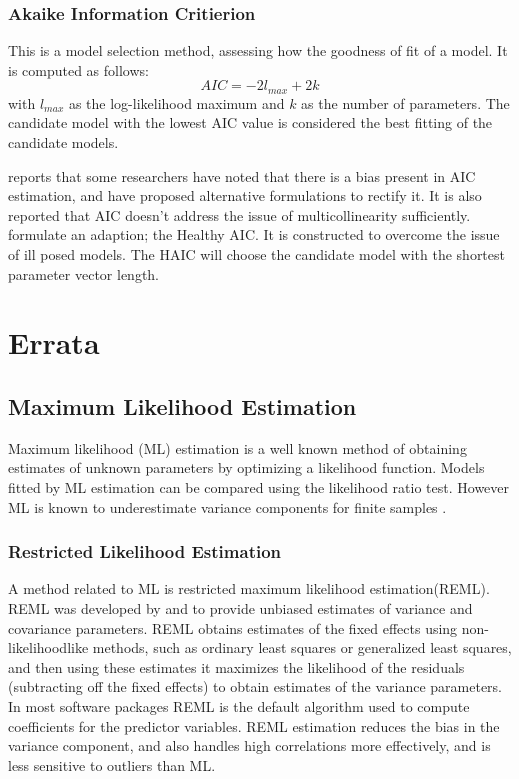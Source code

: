 \documentclass[12pt, a4paper]{report}
\theoremstyle{plain}
\theoremstyle{definition}
\theoremstyle{remark}
\begin{document}
\subsection{Akaike Information Critierion}
This is a model selection method, assessing how the goodness of
fit of a model. It is computed as follows:
\begin{displaymath}
AIC = -2l_{max}+ 2k
\end{displaymath}
with $l_{max}$ as the log-likelihood maximum and $k$ as the number
of parameters. The candidate model with the lowest AIC value is
considered the best fitting of the candidate models.

\citet[p.13]{Demi} reports that some researchers have noted that
there is a bias present in AIC estimation, and have proposed
alternative formulations to rectify it. It is also reported that
AIC doesn't address the issue of multicollinearity sufficiently.
\citet{Demi} formulate an adaption; the Healthy AIC. It is
constructed to overcome the issue of ill posed models. The HAIC
will choose the candidate model with the shortest parameter vector
length.


\chapter{Errata}

\section{Maximum Likelihood Estimation}
Maximum likelihood (ML) estimation is a well known method of
obtaining estimates of unknown parameters by optimizing a
likelihood function. Models fitted by ML estimation can be
compared using the likelihood ratio test. However ML is known to
underestimate variance components for finite samples \citep{Demi}.

\subsection{Restricted Likelihood Estimation}

A method related to ML is restricted maximum likelihood
estimation(REML). REML was developed by \citet*{PT71} and
\citet{Harville} to provide unbiased estimates of variance and
covariance parameters. REML obtains estimates of the fixed effects
using non-likelihoodlike methods, such as ordinary least squares
or generalized least squares, and then using these estimates it
maximizes the likelihood of the residuals (subtracting off the
fixed effects) to obtain estimates of the variance parameters. In
most software packages REML is the default algorithm used to
compute coefficients for the predictor variables. REML estimation
reduces the bias in the variance component, and also handles high
correlations more effectively, and is less sensitive to outliers
than ML.
\end{document}
